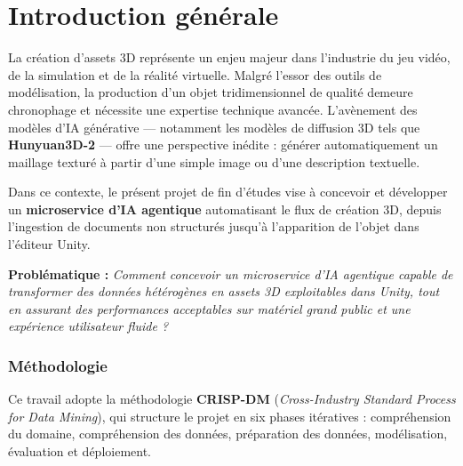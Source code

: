 \documentclass[12pt,a4paper,oneside]{report}
\begin{document}
\cleardoublepage
{}\setcounter{page}{1}

\chapter*{Introduction générale}

\noindent La création d'assets 3D représente un enjeu majeur dans
l'industrie du jeu vidéo, de la simulation et de la réalité virtuelle.
Malgré l'essor des outils de modélisation, la production d'un objet
tridimensionnel de qualité demeure chronophage et nécessite une expertise
technique avancée. L'avènement des modèles d'IA générative — notamment
les modèles de diffusion 3D tels que \textbf{Hunyuan3D-2} — offre une
perspective inédite : générer automatiquement un maillage texturé à partir
d'une simple image ou d'une description textuelle.

\medskip\noindent
Dans ce contexte, le présent projet de fin d'études vise à concevoir et
développer un \textbf{microservice d'IA agentique} automatisant le flux de
création 3D, depuis l'ingestion de documents non structurés jusqu'à
l'apparition de l'objet dans l'éditeur Unity.

\medskip\noindent
\textbf{Problématique :} \textit{Comment concevoir un microservice d'IA
agentique capable de transformer des données hétérogènes en assets 3D
exploitables dans Unity, tout en assurant des performances acceptables sur
matériel grand public et une expérience utilisateur fluide ?}

\subsection*{Méthodologie}
Ce travail adopte la méthodologie \textbf{CRISP-DM} (\textit{Cross-Industry
Standard Process for Data Mining}), qui structure le projet en six phases
itératives : compréhension du domaine, compréhension des données,
préparation des données, modélisation, évaluation et déploiement.
\end{document}
